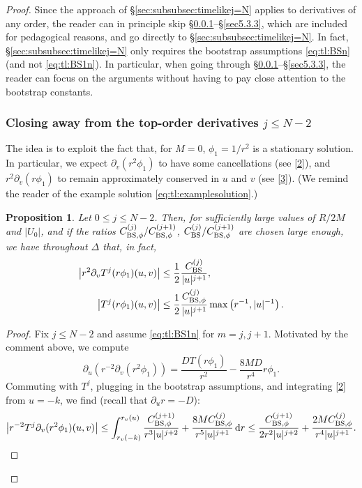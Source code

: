 \documentclass[11pt,english]{article}
\numberwithin{equation}{section}
\theoremstyle{remark}
\theoremstyle{plain}
\newtheorem{prop}{Proposition}[section]
\theoremstyle{remark}
\newcommand{\dd}{\mathop{}\!\mathrm{d}}
\newcommand{\pu}{\partial_u}
\newcommand{\pv}{\partial_v}
\renewcommand{\(}{\left(}
\renewcommand{\)}{\right)}
\begin{document}
\begin{proof}
Since the approach of \S \ref{sec:subsubsec:timelikej=N} applies to derivatives of any order,  the reader can in principle skip \S \ref{sec5.3.2}--\S \ref{sec5.3.3}, which are  included for pedagogical reasons, and go directly to \S \ref{sec:subsubsec:timelikej=N}.
 In fact, \S \ref{sec:subsubsec:timelikej=N} only requires the bootstrap assumptions \eqref{eq:tl:BSn} (and not \eqref{eq:tl:BS1n}). 
In particular, when going through \S\ref{sec5.3.2}--\S\ref{sec5.3.3}, the reader can focus on the arguments without having to pay close attention to the bootstrap constants.

\subsubsection{Closing away from the top-order derivatives \texorpdfstring{$j\leq N-2$}{j<N-1}}\label{sec5.3.2}
The idea is to exploit the fact that, for $M=0$, $\phi_1=1/r^2$ is a stationary solution. 
 In particular, we expect $\pv(r^2\phi_1)$ to have some cancellations (see \eqref{2}), and $r^2\pv(r\phi_1)$ to remain approximately conserved in $u$ and $v$ (see \eqref{3}). (We remind the reader of the example solution \eqref{eq:tl:examplesolution}.)
\begin{prop}\label{prop:tlbs1}
Let $0\leq j\leq N-2$. Then, for sufficiently large values of $R/2M$ and $|U_0|$, and if the ratios $C_{\mathrm{BS},\phi}^{(j)}/C_{\mathrm{BS},\phi}^{(j+1)}$, $C_{\mathrm{BS}}^{(j)}/C_{\mathrm{BS},\phi}^{(j+1)}$  are chosen large enough, we have throughout $\Delta$ that, in fact,
  \begin{align}
  \left|r^2\pv T^j (r\phi_1)(u,v)\right|&\leq\frac12 \frac{\cbs^{(j)}}{|u|^{j+1}},\\
  \left|T^j (r\phi_1)(u,v)\right|&\leq\frac12 \frac{\cbsp^{(j)}}{|u|^{j+1}}\max\left(r^{-1},|u|^{-1}\right).
  \end{align}
\end{prop}
\begin{proof}
Fix $j\leq N-2$ and assume \eqref{eq:tl:BS1n} for $m=j,j+1$.
Motivated by the comment above, we compute
\begin{equation}\label{2}
\pu(r^{-2}\pv(r^2\phi_1))=\frac{DT(r\phi_1)}{r^2}-\frac{8MD}{r^4}r\phi_1.
\end{equation}
Commuting with $T^j$, plugging in the bootstrap assumptions, and integrating \eqref{2} from $u=-k$, we find (recall that $\pu r=-D$):
\begin{align}\label{proof5.2x}
\left|r^{-2}T^j\pv(r^2\phi_1)(u,v)\right|\leq\int_{r_v(-k)}^{r_v(u)} \frac{\cbsp^{(j+1)}}{r^3|u|^{j+2}}+\frac{8M\cbsp^{(j)}}{r^5|u|^{j+1}}\dd r\leq  \frac{\cbsp^{(j+1)}}{2r^2|u|^{j+2}}+\frac{2M\cbsp^{(j)}}{r^4|u|^{j+1}}.

\end{align}
\end{proof}
\end{proof}
\end{document}
